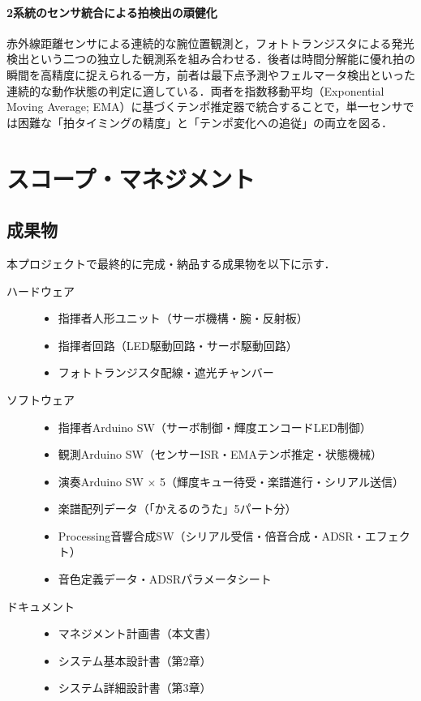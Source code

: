 \documentclass[lualatex,book,paper=a4paper,jafontsize=11.5pt,jafontscale=1.05,oneside]{jlreq}
\begin{document}
\paragraph{2系統のセンサ統合による拍検出の頑健化}
赤外線距離センサによる連続的な腕位置観測と，フォトトランジスタによる発光検出という二つの独立した観測系を組み合わせる．後者は時間分解能に優れ拍の瞬間を高精度に捉えられる一方，前者は最下点予測やフェルマータ検出といった連続的な動作状態の判定に適している．両者を指数移動平均（Exponential Moving Average; EMA）に基づくテンポ推定器で統合することで，単一センサでは困難な「拍タイミングの精度」と「テンポ変化への追従」の両立を図る．

\section{スコープ・マネジメント}\label{sec:scope}

\subsection{成果物}

本プロジェクトで最終的に完成・納品する成果物を以下に示す．

\begin{description}
  \item[ハードウェア]
    \begin{itemize}
      \item 指揮者人形ユニット（サーボ機構・腕・反射板）
      \item 指揮者回路（LED駆動回路・サーボ駆動回路）
      \item フォトトランジスタ配線・遮光チャンバー
    \end{itemize}
  \item[ソフトウェア]
    \begin{itemize}
      \item 指揮者Arduino SW（サーボ制御・輝度エンコードLED制御）
      \item 観測Arduino SW（センサーISR・EMAテンポ推定・状態機械）
      \item 演奏Arduino SW $\times$ 5（輝度キュー待受・楽譜進行・シリアル送信）
      \item 楽譜配列データ（「かえるのうた」5パート分）
      \item Processing音響合成SW（シリアル受信・倍音合成・ADSR・エフェクト）
      \item 音色定義データ・ADSRパラメータシート
    \end{itemize}
  \item[ドキュメント]
    \begin{itemize}
      \item マネジメント計画書（本文書）
      \item システム基本設計書（第2章）
      \item システム詳細設計書（第3章）
    \end{itemize}
\end{description}
\end{document}
